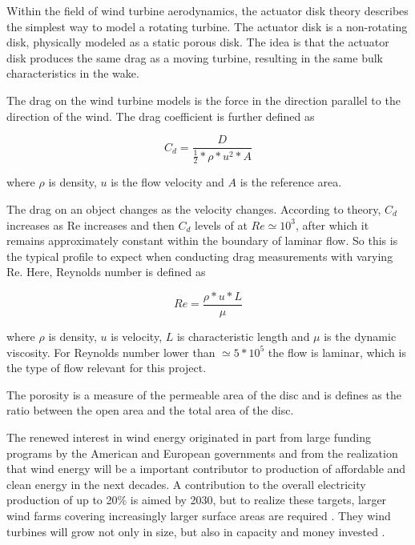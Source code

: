 Within the field of wind turbine aerodynamics, the actuator disk theory describes the simplest way to model a rotating turbine. The actuator disk is a non-rotating disk, physically modeled as a static porous disk. The idea is that the actuator disk produces the same drag as a moving turbine, resulting in the same bulk characteristics in the wake. 

The drag on the wind turbine models is the force in the direction parallel to the direction of the wind. The drag coefficient is further defined as 

\begin{equation}
    C_d = \frac{D}{\frac{1}{2}*\rho*u^2*A}
\end{equation}

where $\rho$ is density, $u$ is the flow velocity and $A$ is the reference area.  

The drag on an object changes as the velocity changes. According to theory, $C_d$ increases as Re increases and then $C_d$ levels of at $ Re \simeq 10^3$, after which it remains approximately constant within the boundary of laminar flow. So this is the typical profile to expect when conducting drag measurements with varying Re. Here, Reynolds number is defined as 

\begin{equation}
    Re = \frac{\rho * u * L}{\mu}
\end{equation}

where $\rho$ is density, $u$ is velocity, $L$ is characteristic length and $\mu$ is the dynamic viscosity. For Reynolds number lower than $\simeq 5 * 10^5$ the flow is laminar, which is the type of flow relevant for this project. 






The porosity is a measure of the permeable area of the disc and is defines as the ratio between the open area and the total area of the disc. 


The renewed interest in wind energy originated in part from large funding programs by the American and European governments and from the realization that wind energy will be a important contributor to production of affordable and clean energy in the next decades. A contribution to the overall electricity production of up to 20\% is aimed by 2030, but to realize these targets, larger wind farms covering increasingly larger surface areas are required \cite{Meyers2012}. They wind turbines will grow not only in size, but also in capacity and money invested \cite{Barthelmie2010}. 

